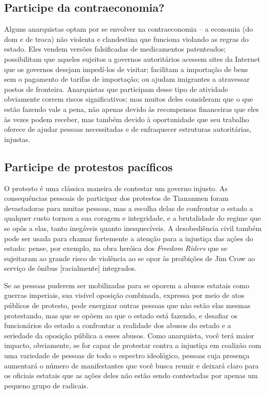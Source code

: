\subsection*{Participe da contraeconomia?}

Alguns anarquistas optam por se envolver na contraeconomia -- a economia (do dom e de troca) não violenta e clandestina que funciona violando as regras do estado. Eles vendem versões falsificadas de medicamentos patenteados; possibilitam que aqueles sujeitos a governos autoritários acessem sites da Internet que os governos desejam impedí-los de visitar; facilitam a importação de bens sem o pagamento de tarifas de importação; ou ajudam imigrantes a atravessar postos de fronteira. Anarquistas que participam desse tipo de atividade obviamente correm riscos significativos; mas muitos deles consideram que o que estão fazendo vale a pena, não apenas devido às recompensas financeiras que eles às vezes podem receber, mas também devido à oportunidade que seu trabalho oferece de ajudar pessoas necessitadas e de enfraquecer estruturas autoritárias, injustas.

\subsection*{Participe de protestos pacíficos}

O protesto é uma clássica maneira de contestar um governo injusto. As consequências pessoais de participar dos protestos de Tiananmen foram devastadoras para muitas pessoas, mas a escolha delas de confrontar o estado a qualquer custo tornou a sua coragem e integridade, e a brutalidade do regime que se opôs a elas, tanto inegáveis quanto inesquecíveis. A desobediência civil também pode ser usada para chamar fortemente a atenção para a injustiça das ações do estado: pense, por exemplo, na obra heróica dos \emph{Freedom Riders} que se sujeitaram ao grande risco de violência ao se opor às proibições de Jim Crow ao serviço de ônibus [racialmente] integrados. 

Se as pessoas puderem ser mobilizadas para se oporem a abusos estatais como guerras imperiais, sua visível oposição combinada, expressa por meio de atos públicos de protesto, pode energizar outras pessoas que não estão elas mesmas protestando, mas que se opõem ao que o estado está fazendo, e desafiar os funcionários do estado a confrontar a realidade dos abusos do estado e a seriedade da oposição pública a esses abusos. Como anarquista, você terá maior impacto, obviamente, se for capaz de protestar contra a injustiça em coalizão com uma variedade de pessoas de todo o espectro ideológico, pessoas cuja presença aumentará o número de manifestantes que você busca reunir e deixará claro para os oficiais estatais que as ações deles não estão sendo contestadas por apenas um pequeno grupo de radicais.

